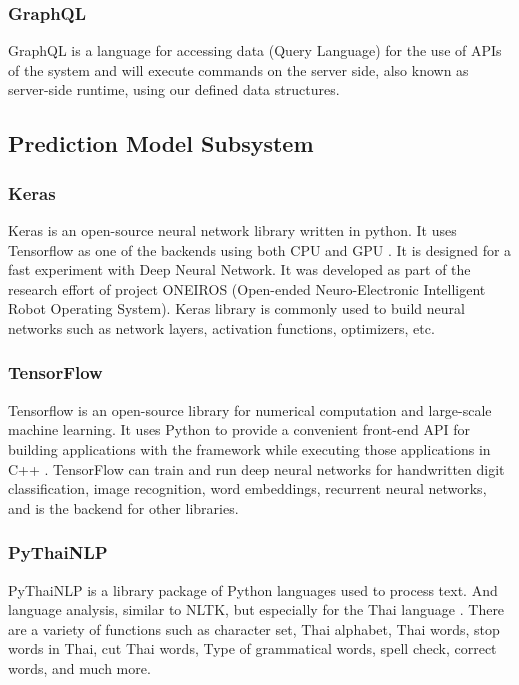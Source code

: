 \documentclass[12pt,oneside,openright,a4paper]{cpe-english-project}
\begin{document}
\subsubsection{GraphQL}
GraphQL is a language for accessing data (Query Language) for the use of APIs of the system \cite{what_is_graphql}
and will execute commands on the server side, also known as server-side runtime, using our defined
data structures.

\subsection{Prediction Model Subsystem}
\subsubsection{Keras}
Keras is an open-source neural network library written in python. It uses Tensorflow as one of the
backends using both CPU and GPU \cite{keras}. It is designed for a fast experiment with Deep Neural
Network. It was developed as part of the research effort of project ONEIROS (Open-ended Neuro-Electronic
Intelligent Robot Operating System). Keras library is commonly used to build neural networks such as network
layers, activation functions, optimizers, etc.

\subsubsection{TensorFlow}
Tensorflow is an open-source library for numerical computation and large-scale machine learning.
It uses Python to provide a convenient front-end API for building applications with the framework
while executing those applications in C++ \cite{what_is_tf}. TensorFlow can train and run deep neural
networks for handwritten digit classification, image recognition, word embeddings, recurrent neural
networks, and is the backend for other libraries.

\subsubsection{PyThaiNLP}
PyThaiNLP is a library package of Python languages used to process text. And language analysis,
similar to NLTK, but especially for the Thai language \cite{pythainlp}.
There are a variety of functions such as character set, Thai alphabet, Thai words,
stop words in Thai, cut Thai words, Type of grammatical words, spell check, correct words,
and much more.
\end{document}
